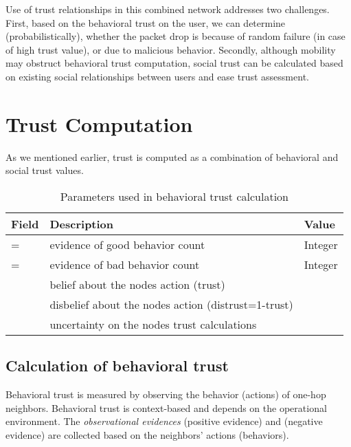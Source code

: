 \documentclass[conference]{IEEEtran}
\begin{document}
Use of trust relationships in this combined network addresses  two challenges. First, based on the behavioral trust on the user, we can determine (probabilistically), whether the packet drop is because of random failure (in case of high trust value), or due to malicious behavior. Secondly, although mobility may obstruct behavioral trust computation, social trust can be calculated based on existing social 	 relationships between users and ease trust assessment.  \section{Trust Computation}
\label{sec:model}
As we mentioned earlier, trust is computed as a combination of behavioral and social trust values.
\begin{table}[t]
\caption{Parameters used in behavioral trust calculation}
\label{message_table_1}
\centering \begin{tabular}{|p{1.5cm}| p{3cm}| p{3cm}|}
    \hline
    \textbf{Field}&\textbf{Description} & \textbf{Value}\\
    \hline
    = & evidence of good behavior count & Integer\\
    \hline
    = & evidence of bad behavior count & Integer\\
    \hline
     & belief about the nodes action (trust) & \\
    \hline
     & disbelief about the nodes action (distrust=1-trust) & \\
    \hline
      & uncertainty on the nodes trust calculations & \\
    \hline
 \end{tabular}
\end{table}





\subsection{Calculation of behavioral trust}
\label{behave_trust_12}
Behavioral trust is measured by observing the behavior (actions) of one-hop neighbors. Behavioral trust is context-based and depends on the operational environment. The \emph{observational evidences}  (positive evidence) and  (negative evidence) are collected based on the neighbors' actions (behaviors).
\end{document}
